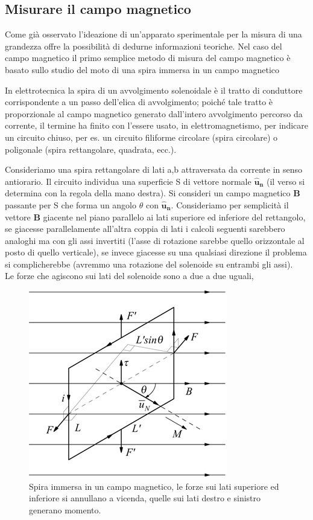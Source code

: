 \documentclass[
10pt, %
a4paper, %
oneside, %
headinclude,footinclude, %
BCOR5mm, %
]{scrartcl}
\begin{document}
\subsection{Misurare il campo magnetico}
Come già osservato l'ideazione di un'apparato sperimentale per la misura di una grandezza offre la possibilità di dedurne informazioni teoriche. Nel caso del campo magnetico il primo semplice metodo di misura del campo magnetico è basato sullo studio del moto di una spira immersa in un campo magnetico
\begin{definizione}[Spira]
	 In elettrotecnica la spira di un avvolgimento solenoidale è il tratto di conduttore corrispondente a un passo dell’elica di avvolgimento; poiché tale tratto è proporzionale al campo magnetico generato dall'intero avvolgimento percorso da corrente, il termine ha finito con l’essere usato, in elettromagnetismo, per indicare un circuito chiuso, per es. un circuito filiforme circolare (spira circolare) o poligonale (spira rettangolare, quadrata, ecc.).
\end{definizione}
Consideriamo una spira rettangolare di lati a,b attraversata da corrente in senso antiorario. Il circuito individua una superficie S di vettore normale $\mathbf{\hat{u}_n}$ (il verso si determina con la regola della mano destra). Si consideri un campo magnetico $\mathbf{B}$ passante per S che forma un angolo $\theta$ con $\mathbf{\hat{u}_n}$. Consideriamo per semplicità il vettore $\mathbf{B}$ giacente nel piano parallelo ai lati superiore ed inferiore del rettangolo, se giacesse parallelamente all'altra coppia di lati i calcoli seguenti sarebbero analoghi ma con gli assi invertiti (l'asse di rotazione sarebbe quello orizzontale al posto di quello verticale), se invece giacesse su una qualsiasi direzione il problema si complicherebbe (avremmo una rotazione del solenoide su entrambi gli assi).\\
Le forze che agiscono sui lati del solenoide sono a due a due uguali,
\begin{figure}[h!]
	\centering
	\includegraphics[width=0.5\linewidth]{../images/spira_campo_magnetico}
	\caption{Spira immersa in un campo magnetico, le forze sui lati superiore ed inferiore si annullano a vicenda, quelle sui lati destro e sinistro generano momento.}
	\label{fig:spiracampomagnetico}
\end{figure}
\end{document}
